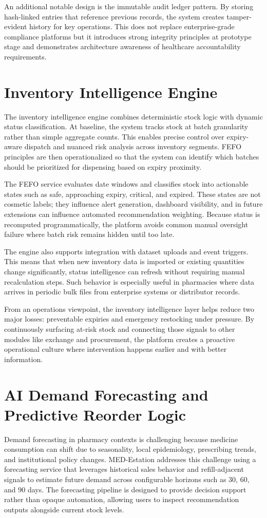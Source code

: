\documentclass[12pt,a4paper]{report}
\begin{document}
An additional notable design is the immutable audit ledger pattern. By storing hash-linked entries that reference previous records, the system creates tamper-evident history for key operations. This does not replace enterprise-grade compliance platforms but it introduces strong integrity principles at prototype stage and demonstrates architecture awareness of healthcare accountability requirements.

\chapter{Inventory Intelligence Engine}
The inventory intelligence engine combines deterministic stock logic with dynamic status classification. At baseline, the system tracks stock at batch granularity rather than simple aggregate counts. This enables precise control over expiry-aware dispatch and nuanced risk analysis across inventory segments. FEFO principles are then operationalized so that the system can identify which batches should be prioritized for dispensing based on expiry proximity.

The FEFO service evaluates date windows and classifies stock into actionable states such as safe, approaching expiry, critical, and expired. These states are not cosmetic labels; they influence alert generation, dashboard visibility, and in future extensions can influence automated recommendation weighting. Because status is recomputed programmatically, the platform avoids common manual oversight failure where batch risk remains hidden until too late.

The engine also supports integration with dataset uploads and event triggers. This means that when new inventory data is imported or existing quantities change significantly, status intelligence can refresh without requiring manual recalculation steps. Such behavior is especially useful in pharmacies where data arrives in periodic bulk files from enterprise systems or distributor records.

From an operations viewpoint, the inventory intelligence layer helps reduce two major losses: preventable expiries and emergency restocking under pressure. By continuously surfacing at-risk stock and connecting those signals to other modules like exchange and procurement, the platform creates a proactive operational culture where intervention happens earlier and with better information.

\chapter{AI Demand Forecasting and Predictive Reorder Logic}
Demand forecasting in pharmacy contexts is challenging because medicine consumption can shift due to seasonality, local epidemiology, prescribing trends, and institutional policy changes. MED-Estation addresses this challenge using a forecasting service that leverages historical sales behavior and refill-adjacent signals to estimate future demand across configurable horizons such as 30, 60, and 90 days. The forecasting pipeline is designed to provide decision support rather than opaque automation, allowing users to inspect recommendation outputs alongside current stock levels.
\end{document}
